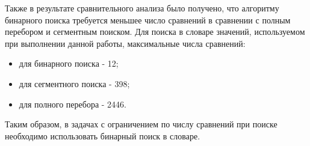 Также в результате сравнительного анализа было получено, что алгоритму бинарного поиска требуется меньшее число сравнений в сравнении с полным перебором и сегментным поиском. Для поиска в словаре значений, используемом при выполнении данной работы, максимальные числа сравнений:

\begin{itemize}
	\item для бинарного поиска - 12;
	\item для сегментного поиска - 398;
	\item для полного перебора - 2446.
\end{itemize}

Таким образом, в задачах с ограничением по числу сравнений при поиске необходимо использовать бинарный поиск в словаре.